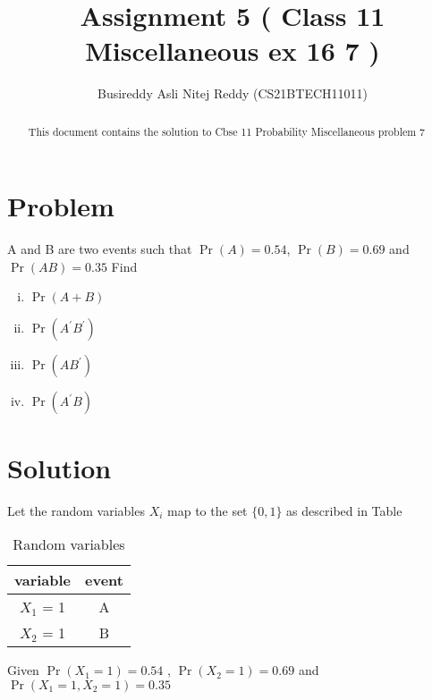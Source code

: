 \documentclass[journal,12pt,twocolumn]{IEEEtran}
\title{Assignment 5 ( Class 11 Miscellaneous ex 16 7 )}
\author{Busireddy Asli Nitej Reddy (CS21BTECH11011)}
\date{}
\providecommand{\pr}[1]{\ensuremath{\Pr\left(#1\right)}}
\begin{document}
\maketitle



\begin{abstract}
This document contains the solution to Cbse 11  Probability Miscellaneous problem 7	
\end{abstract}



\section*{\textbf{Problem}}

 A and B are two events such that  $\pr{A} = 0.54$, $\pr{B} = 0.69$ and $\pr{A B} = 0.35$ Find
     \begin{enumerate}[i)]
         \item $\pr{A+B}$
         \item $\pr{A^{\prime} B^{\prime}}$
         \item $\pr{A B^{\prime}}$
         \item $\pr{A^{\prime} B}$
     \end{enumerate}



\section*{\textbf{Solution}}


Let the random variables $X_{i}$ map to the set $\{ 0,1 \}$ as described in Table


    \begin{table}[!htb]
        \centering
         {
          
            \begin{tabular}{|c|c|}
              \hline
               variable & event \\ \hline
               $X_{1}$ = 1  & A  \\ \hline
               $X_{2}$ = 1  & B   \\
              \hline
            \end{tabular}
            
            }
        \caption{ Random variables }
        \label{tab:table}
    \end{table}



Given  $\pr{X_{1} = 1} = 0.54$ , $\pr{X_{2} = 1} = 0.69$ and $\pr{X_{1}=1,X_{2}=1} = 0.35$
\end{document}
